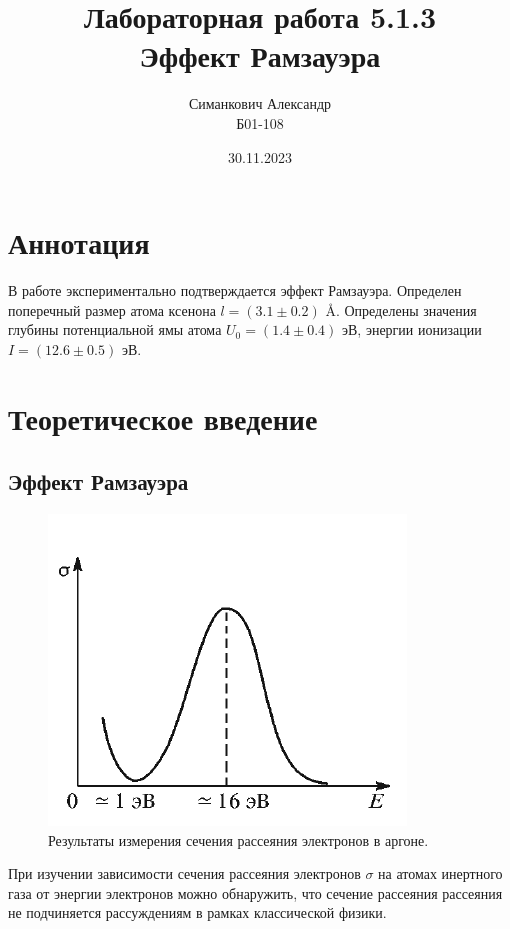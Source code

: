 \documentclass[12pt,a4paper]{article}
\title{Лабораторная работа 5.1.3 \\ Эффект Рамзауэра}
\author{Симанкович Александр\\ Б01-108}
\date{30.11.2023}
\begin{document}
	\maketitle
	
	\section*{Аннотация}
	
	В работе экспериментально подтверждается эффект Рамзауэра. Определен поперечный размер атома ксенона $l = (3.1 \pm 0.2)$ \AA. Определены значения глубины потенциальной ямы атома $U_0 = (1.4 \pm 0.4)$ эВ, энергии ионизации $I = (12.6 \pm 0.5)$ эВ.
	
	\section*{Теоретическое введение}
	
	\subsection*{Эффект Рамзауэра}

	\begin{figure}
		\includegraphics[scale=0.6]{res/example.png}
		\caption{Результаты измерения сечения рассеяния электронов в аргоне.}
		\label{fig:example}
		\vspace{0pt}
	\end{figure}
	
	При изучении зависимости сечения рассеяния электронов $\sigma$ на атомах инертного газа от энергии электронов можно обнаружить, что сечение рассеяния рассеяния не подчиняется рассуждениям в рамках классической физики.
	
\end{document}
